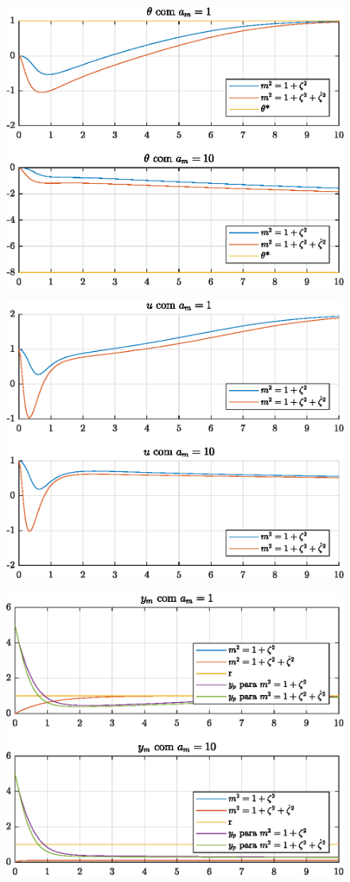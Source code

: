 \begin{figure}[H]
  \centering
  \includegraphics[width=12cm]{figs/theta/am1am10.eps} 
\end{figure}

\begin{figure}[H]
  \centering
  \includegraphics[width=12cm]{figs/u/am1am10.eps} 
\end{figure}

\begin{figure}[H]
  \centering
  \includegraphics[width=12cm]{figs/yp/am1am10.eps} 
\end{figure}

\newpage%
